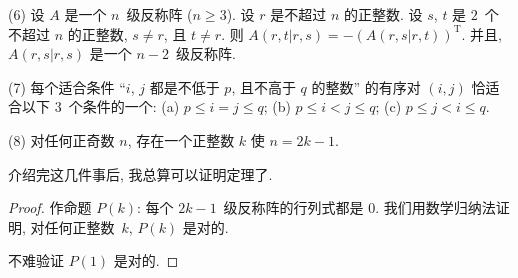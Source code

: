 \documentclass[../libro.tex]{subfiles}
\begin{document}
(6)
设 \(A\) 是一个 \(n\)~级反称阵 (\(n \geq 3\)).
设 \(r\) 是不超过 \(n\) 的正整数.
设 \(s\), \(t\) 是 \(2\)~个不超过 \(n\) 的正整数,
\(s \neq r\), 且 \(t \neq r\).
则
\(A(r,t|r,s) = -(A(r,s|r,t))^{\mathrm{T}}\).
并且, \(A(r,s|r,s)\)
是一个 \(n-2\)~级反称阵.

(7)
每个适合条件
``\(i\), \(j\) 都是不低于 \(p\), 且不高于 \(q\) 的整数''
的有序对 \((i, j)\) 恰适合以下 \(3\)~个条件的一个:
(a)
\(p \leq i = j \leq q\);
(b)
\(p \leq i < j \leq q\);
(c)
\(p \leq j < i \leq q\).

(8)
对任何正奇数 \(n\), 存在一个正整数 \(k\)
使 \(n = 2k - 1\).

\vspace{2ex}

介绍完这几件事后, 我总算可以证明定理了.

\begin{proof}
    作命题 \(P(k)\):
    每个 \(2k - 1\)~级反称阵的行列式都是 \(0\).
    我们用数学归纳法证明,
    对任何正整数~\(k\),
    \(P(k)\) 是对的.

    不难验证 \(P(1)\) 是对的.


\end{proof}
\end{document}

